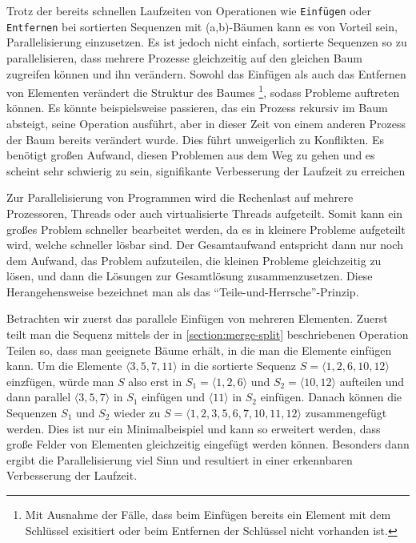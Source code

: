 Trotz der bereits schnellen Laufzeiten von Operationen wie \texttt{Einfügen} oder \texttt{Entfernen} bei sortierten Sequenzen mit (a,b)-Bäumen kann es von Vorteil sein, Parallelisierung einzusetzen. Es ist jedoch nicht einfach, sortierte Sequenzen so zu parallelisieren, dass mehrere Prozesse gleichzeitig auf den gleichen Baum zugreifen können und ihn verändern. Sowohl das Einfügen als auch das Entfernen von Elementen verändert die Struktur des Baumes \footnote{Mit Ausnahme der Fälle, dass beim Einfügen bereits ein Element mit dem Schlüssel exisitiert oder beim Entfernen der Schlüssel nicht vorhanden ist.}, sodass Probleme auftreten können. Es könnte beispielsweise passieren, das ein Prozess rekursiv im Baum absteigt, seine Operation ausführt, aber in dieser Zeit von einem anderen Prozess der Baum bereits verändert wurde. Dies führt unweigerlich zu Konflikten. Es benötigt großen Aufwand, diesen Problemen aus dem Weg zu gehen und es scheint sehr schwierig zu sein, signifikante Verbesserung der Laufzeit zu erreichen \cite{Sanders:19}
\par
Zur Parallelisierung von Programmen wird die Rechenlast auf mehrere Prozessoren, Threads oder auch virtualisierte Threads aufgeteilt. Somit kann ein großes Problem schneller bearbeitet werden, da es in kleinere Probleme aufgeteilt wird, welche schneller lösbar sind. Der Gesamtaufwand entspricht dann nur noch dem Aufwand, das Problem aufzuteilen, die kleinen Probleme gleichzeitig zu lösen, und dann die Lösungen zur Gesamtlösung zusammenzusetzen. Diese Herangehensweise bezeichnet man als das "`Teile-und-Herrsche"'-Prinzip.
\par
Betrachten wir zuerst das parallele Einfügen von mehreren Elementen. Zuerst teilt man die Sequenz mittels der in \autoref{section:merge-split} beschriebenen Operation Teilen so, dass man geeignete Bäume erhält, in die man die Elemente einfügen kann. Um die Elemente $\langle 3,5,7,11 \rangle$ in die sortierte Sequenz $S = \langle 1,2,6,10,12 \rangle$ einzfügen, würde man $S$ also erst in $S_1 = \langle 1,2,6 \rangle$ und $S_2 = \langle 10,12 \rangle$ aufteilen und dann parallel $\langle 3,5,7 \rangle$ in $S_1$ einfügen und $\langle 11 \rangle$ in $S_2$ einfügen. Danach können die Sequenzen $S_1$ und $S_2$ wieder zu $S = \langle 1,2,3,5,6,7,10,11,12 \rangle$ zusammengefügt werden. Dies ist nur ein Minimalbeispiel und kann so erweitert werden, dass große Felder von Elementen gleichzeitig eingefügt werden können. Besonders dann ergibt die Parallelisierung viel Sinn und resultiert in einer erkennbaren Verbesserung der Laufzeit. \cite{Sanders:19}

